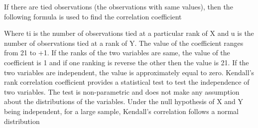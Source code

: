 If there are tied observations (the observations with same values), then the following formula is used to find the correlation coefficient

   Where ti is the number of observations tied at a particular rank of X and u is the number of observations tied at a rank of Y. The value of the coefficient ranges from 21 to +1. If the ranks of the two variables are same, the value of the coefficient is 1 and if one ranking is reverse the other then the value is 21. If the two variables are independent, the value is approximately equal to zero.
Kendall’s rank correlation coefficient provides a statistical test to test the independence of two variables. The test is non-parametric and does not make any assumption about the distributions of the variables.
Under the null hypothesis of X and Y being independent, for a large sample, Kendall’s correlation follows a normal distribution
